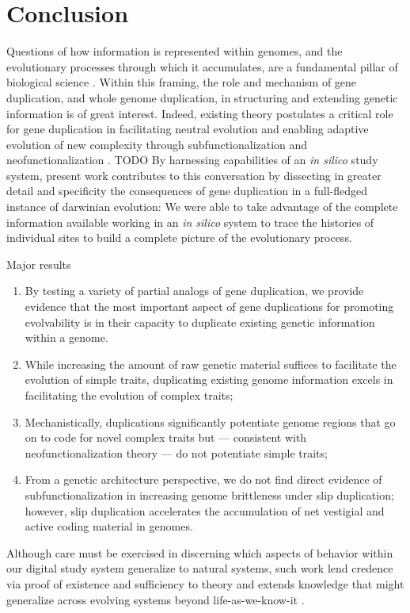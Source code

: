 \section{Conclusion} \label{sec:conclusion}

Questions of how information is represented within genomes, and the evolutionary processes through which it accumulates, are a fundamental pillar of biological science \citep{adami2024evolution}.
Within this framing, the role and mechanism of gene duplication, and whole genome duplication, in structuring and extending genetic information is of great interest.
Indeed, existing theory postulates a critical role for gene duplication in facilitating neutral evolution and enabling adaptive evolution of new complexity through subfunctionalization and neofunctionalization \citep{ohno1970evolution}.
TODO
By harnessing capabilities of an \textit{in silico} study system, present work contributes to this conversation by dissecting in greater detail and specificity the consequences of gene duplication in a full-fledged instance of darwinian evolution:
We were able to take advantage of the complete information available working in an \textit{in silico} system to trace the histories of individual sites to build a complete picture of the evolutionary process.

Major results
\begin{enumerate}
\item By testing a variety of partial analogs of gene duplication, we provide evidence that the most important aspect of gene duplications for promoting evolvability is in their capacity to duplicate existing genetic information within a genome.
\item While increasing the amount of raw genetic material suffices to facilitate the evolution of simple traits, duplicating existing genome information excels in facilitating the evolution of complex traits;
\item Mechanistically, duplications significantly potentiate genome regions that go on to code for novel complex traits but --- consistent with neofunctionalization theory --- do not potentiate simple traits;
\item From a genetic architecture perspective, we do not find direct evidence of subfunctionalization in increasing genome brittleness under slip duplication; however, slip duplication accelerates the accumulation of net vestigial and active coding material in genomes.
\end{enumerate}
Although care must be exercised in discerning which aspects of behavior within our digital study system generalize to natural systems, such work lend credence via proof of existence and sufficiency to theory and extends knowledge that might generalize across evolving systems beyond life-as-we-know-it \citep{dorin2024what}.

